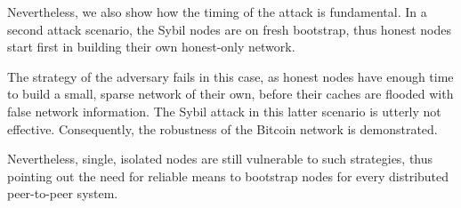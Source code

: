 Nevertheless, we also show how the timing of the attack is fundamental. In a second attack scenario, the Sybil nodes are on fresh bootstrap, thus honest nodes start first in building their own honest-only network.

The strategy of the adversary fails in this case, as honest nodes have enough time to build a small, sparse network of their own, before their caches are flooded with false network information. The Sybil attack in this latter scenario is utterly not effective. Consequently, the robustness of the Bitcoin network is demonstrated.

Nevertheless, single, isolated nodes are still vulnerable to such strategies, thus pointing out the need for reliable means to bootstrap nodes for every distributed peer-to-peer system.




